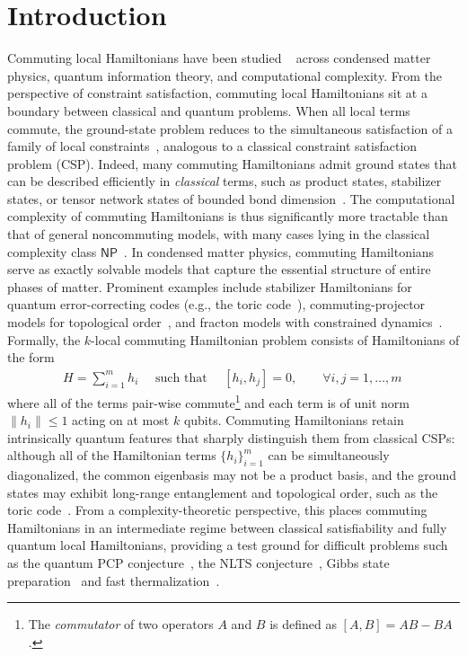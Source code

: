 \documentclass[a4paper,onecolumn,11pt]{quantumarticle}
\theoremstyle{plain}
\begin{document}
\section{Introduction}
\label{sec:introduction}
Commuting local Hamiltonians have been studied ~\cite{bravyi2004commutativeversionklocalhamiltonian,aharonov2011complexity,schuch2011complexitycommutinghamiltonianssquare,AKV,irani2023commutinglocalhamiltonianproblem,bostanci2025commutinglocalhamiltonians2d} across condensed matter physics, quantum information theory, and computational complexity. From the perspective of constraint satisfaction, commuting local Hamiltonians sit at a boundary between classical and quantum problems.  When all local terms commute, the ground-state problem reduces to the simultaneous satisfaction of a family of local constraints~\cite{bravyi2004commutativeversionklocalhamiltonian}, analogous to a classical constraint satisfaction problem (CSP). Indeed, many commuting Hamiltonians admit ground states that can be described efficiently in \emph{classical} terms, such as product states, stabilizer states, or tensor network states of bounded bond dimension~\cite{Gharibian_2015}. The computational complexity of commuting Hamiltonians is thus significantly more tractable than that of general noncommuting models, with many cases lying in the classical complexity class $\mathsf{NP}$~\cite{bravyi2004commutativeversionklocalhamiltonian,irani2023commutinglocalhamiltonianproblem,bostanci2025commutinglocalhamiltonians2d}.
In condensed matter physics, commuting Hamiltonians serve as exactly solvable models that capture the essential structure of entire phases of matter.  Prominent examples include stabilizer Hamiltonians for quantum error-correcting codes (e.g., the toric code~\cite{Kitaev_2003}), commuting-projector models for topological order~\cite{Levin_2005}, and fracton models with constrained dynamics~\cite{Vijay_2016}. 
Formally, the $k$-local commuting Hamiltonian problem consists of Hamiltonians of the form
\begin{align}
H=\sum_{i=1}^m h_i \quad \text{ such that } \quad [h_i,h_j]=0, \quad\quad  \forall i,j=1,\dots,m \,
\end{align}
where all of the terms pair-wise commute\footnote{The \emph{commutator} of two operators $A$ and $B$ is defined as $[A,B] = AB - BA$.} and each term is of unit norm $\|h_i\|\leq 1$ acting on at most $k$ qubits.
Commuting Hamiltonians retain intrinsically quantum features that sharply distinguish them from classical CSPs: although all of the Hamiltonian terms $\{h_i\}_{i=1}^m$ can be simultaneously diagonalized, the common eigenbasis may not be a product basis, and the ground states may exhibit long-range entanglement and topological order, such as the toric code~\cite{Kitaev_2003}. From a complexity-theoretic perspective, this places commuting Hamiltonians in an intermediate regime between classical satisfiability and fully quantum local Hamiltonians, providing a test ground for difficult problems such as the quantum PCP conjecture~\cite{aharonov2011complexity,Hastings2012}, the NLTS conjecture~\cite{Anshu_2023}, Gibbs state preparation~\cite{kastoryano2016quantumgibbssamplerscommuting} and fast thermalization~\cite{chen2023fastthermalizationeigenstatethermalization}.
\end{document}

